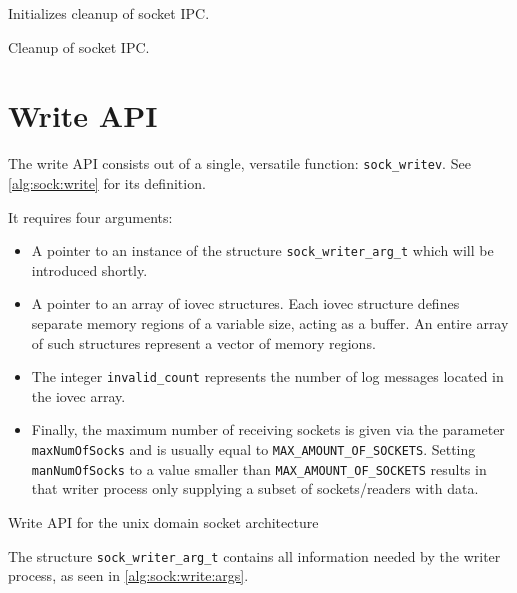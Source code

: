 \begin{algorithm}[h!]
    
    \caption[Socket: Socket finalization]{Initializes cleanup of socket \ac{IPC}.}
    \label{alg:sock:finalize}
\end{algorithm}

\begin{algorithm}[h!]
    
    \caption[Socket: Socket cleanup]{Cleanup of socket \ac{IPC}.}
    \label{alg:sock:cleanup}
\end{algorithm}

\section{Write \ac{API}}
The write \ac{API} consists out of a single, versatile function\@: \texttt{sock\_writev}.
See \ref{alg:sock:write} for its definition.

It requires four arguments:
\begin{itemize}
    \item A pointer to an instance of the structure \texttt{sock\_writer\_arg\_t} which will be introduced shortly.
    \item A pointer to an array of iovec structures.
            Each iovec structure defines separate memory regions of a variable size, acting as a buffer.
            An entire array of such structures represent a vector of memory regions\cite{man:iovec}.
    \item The integer \texttt{invalid\_count} represents the number of log messages located in the iovec array.
    \item Finally, the maximum number of receiving sockets is given via the parameter \texttt{maxNumOfSocks} and is usually equal to \texttt{MAX\_AMOUNT\_OF\_SOCKETS}.
            Setting \texttt{manNumOfSocks} to a value smaller than \texttt{MAX\_AMOUNT\_OF\_SOCKETS} results in that writer process only supplying a subset of sockets/readers with data.
\end{itemize}

\begin{algorithm}[h!]
    
    \caption[Socket: Write \ac{API}]{Write \ac{API} for the unix domain socket architecture}
    \label{alg:sock:write}
\end{algorithm}

The structure \texttt{sock\_writer\_arg\_t} contains all information needed by the writer process, as seen in \ref{alg:sock:write:args}.

